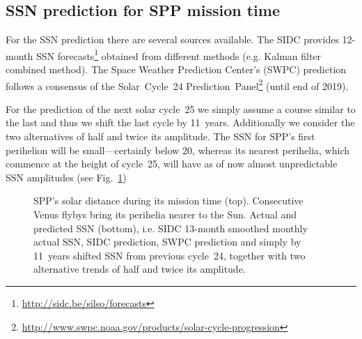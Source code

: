 \subsection{SSN prediction for SPP mission time}
For the SSN prediction there are several sources available. The SIDC provides 12-month SSN forecasts\footnote{\url{http://sidc.be/silso/forecasts}} obtained from different methods (e.g. Kalman filter combined method). The Space Weather Prediction Center's (SWPC) prediction follows a consensus of the Solar~Cycle~24 Prediction~Panel\footnote{\url{http://www.swpc.noaa.gov/products/solar-cycle-progression}} (until end of 2019).

For the prediction of the next solar cycle~25 we simply assume a course similar to the last and thus we shift the last cycle by 11~years. Additionally we consider the two alternatives of half and twice its amplitude. The SSN for SPP's first perihelion will be small---certainly below 20, whereas its nearest perihelia, which commence at the height of cycle~25, will have as of now almost unpredictable SSN amplitudes (see Fig.~\ref{fig:SPP_orbit_predicted_SSN_overview_d_plot})\\
\begin{figure}
	\caption{SPP's solar distance during its mission time (top). Consecutive Venus flybys bring its perihelia nearer to the Sun. Actual and predicted SSN (bottom), i.e. SIDC 13-month smoothed monthly actual SSN, SIDC prediction, SWPC prediction and simply by 11~years shifted SSN from previous cycle~24, together with two alternative trends of half and twice its amplitude.}
	\label{fig:SPP_orbit_predicted_SSN_overview_d_plot}
\end{figure}

